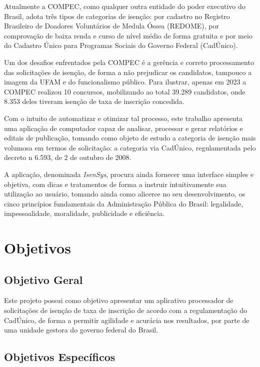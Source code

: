 \documentclass[
	12pt,			%
	openright,		%
	oneside,	
	a4paper,		%
	english,		%
	brazil			%
]{abntex2/abntex2}  %
\begin{document}
	Atualmente a COMPEC, como qualquer outra entidade do poder executivo do Brasil, adota três tipos de categorias de isenção: por cadastro no Registro Brasileiro de Doadores Voluntários de Medula Óssea (REDOME), por comprovação de baixa renda e curso de nível médio de forma gratuita e por meio do Cadastro Único para Programas Sociais do Governo Federal (CadÚnico).
	
	Um dos desafios enfrentados pela COMPEC é a gerência e correto processamento das solicitações de isenção, de forma a não prejudicar os candidatos, tampouco a imagem da UFAM e do funcionalismo público. Para ilustrar, apenas em 2023 a COMPEC realizou 10 concursos, mobilizando ao total 39.289 candidatos, onde 8.353 deles tiveram isenção de taxa de inscrição concedida.
	
	Com o intuito de automatizar e otimizar tal processo, este trabalho apresenta uma aplicação de computador capaz de analisar, processar e gerar relatórios e editais de publicação, tomando como objeto de estudo a categoria de isenção mais volumosa em termos de solicitação: a categoria via CadÚnico, regulamentada pelo decreto n{\textdegree} 6.593, de 2 de outubro de 2008.
	
	A aplicação, denominada \textit{IsenSys}, procura ainda fornecer uma interface simples e objetiva, com dicas e tratamentos de forma a instruir intuitivamente sua utilização ao usuário, tomando ainda como alicerce no seu desenvolvimento, os cinco princípios fundamentais da Administração Pública do Brasil: legalidade, impessoalidade, moralidade, publicidade e eficiência.

	\section{Objetivos}
	
		\subsection{Objetivo Geral}
		
		Este projeto possui como objetivo apresentar um aplicativo processador de solicitações de isenção de taxa de inscrição de acordo com a regulamentação do CadÚnico, de forma a permitir agilidade e acurácia nos resultados, por parte de uma unidade gestora do governo federal do Brasil.
		
		\subsection{Objetivos Específicos}
		
\end{document}
